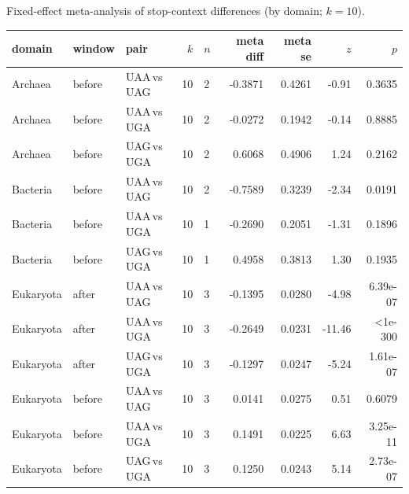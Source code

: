 Fixed-effect meta-analysis of stop-context differences (by domain; $k=10$).

\begingroup
{}
\scriptsize
\setlength{\tabcolsep}{4pt}
\renewcommand{\arraystretch}{1.10}
\setlength{\LTleft}{0pt}
\setlength{\LTright}{0pt}
\begin{longtable}{lllrlrrrr}
\toprule
domain & window & pair & $k$ & $n$ & meta diff & meta se & $z$ & $p$ \\
\midrule
Archaea & before & UAA$\,$vs$\,$UAG & 10 & 2 & -0.3871 & 0.4261 & -0.91 & 0.3635 \\
Archaea & before & UAA$\,$vs$\,$UGA & 10 & 2 & -0.0272 & 0.1942 & -0.14 & 0.8885 \\
Archaea & before & UAG$\,$vs$\,$UGA & 10 & 2 & 0.6068 & 0.4906 & 1.24 & 0.2162 \\
Bacteria & before & UAA$\,$vs$\,$UAG & 10 & 2 & -0.7589 & 0.3239 & -2.34 & 0.0191 \\
Bacteria & before & UAA$\,$vs$\,$UGA & 10 & 1 & -0.2690 & 0.2051 & -1.31 & 0.1896 \\
Bacteria & before & UAG$\,$vs$\,$UGA & 10 & 1 & 0.4958 & 0.3813 & 1.30 & 0.1935 \\
Eukaryota & after & UAA$\,$vs$\,$UAG & 10 & 3 & -0.1395 & 0.0280 & -4.98 & 6.39e-07 \\
Eukaryota & after & UAA$\,$vs$\,$UGA & 10 & 3 & -0.2649 & 0.0231 & -11.46 & <1e-300 \\
Eukaryota & after & UAG$\,$vs$\,$UGA & 10 & 3 & -0.1297 & 0.0247 & -5.24 & 1.61e-07 \\
Eukaryota & before & UAA$\,$vs$\,$UAG & 10 & 3 & 0.0141 & 0.0275 & 0.51 & 0.6079 \\
Eukaryota & before & UAA$\,$vs$\,$UGA & 10 & 3 & 0.1491 & 0.0225 & 6.63 & 3.25e-11 \\
Eukaryota & before & UAG$\,$vs$\,$UGA & 10 & 3 & 0.1250 & 0.0243 & 5.14 & 2.73e-07 \\
\bottomrule
\end{longtable}
\endgroup

